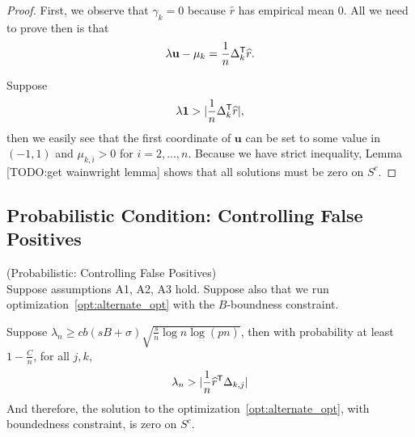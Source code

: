 \documentclass{article}
\begin{document}
\begin{proof}
First, we observe that $\gamma_k = 0$ because $\hat{r}$ has empirical mean 0. All we need to prove then is that 
\[
\lambda \mathbf{u} - \mu_k = \frac{1}{n} \Delta_k^{\mathsf{T}} \widehat{r}.
\]

Suppose
\[
\lambda \mathbf{1} > |\frac{1}{n} \Delta_k^{\mathsf{T}}\widehat{r}|,
\]
then we easily see that the first coordinate of $\mathbf{u}$ can be set to some value in $(-1,1)$ and $\mu_{k,i} > 0$ for $i=2,...,n$. Because we have strict inequality, Lemma [TODO:get wainwright lemma] shows that all solutions must be zero on $S^c$.
\end{proof}








\subsection{Probabilistic Condition: Controlling False Positives}

\begin{theorem} (Probabilistic: Controlling False Positives) \\
Suppose assumptions A1, A2, A3 hold. Suppose also that we run optimization~\ref{opt:alternate_opt} with the $B$-boundness constraint.

Suppose $\lambda_n \geq c b (sB + \sigma) \sqrt{ \frac{s}{n} \log n \log (pn)}$, then with probability at least $ 1 - \frac{C}{n}$, for all $j,k$,
\[
\lambda_n >  | \frac{1}{n} \widehat{r}^{\mathsf{T}} \Delta_{k,j}|
\]
And therefore, the solution to the optimization~\ref{opt:alternate_opt}, with boundedness constraint, is zero on $S^c$.
\end{theorem}
\end{document}
